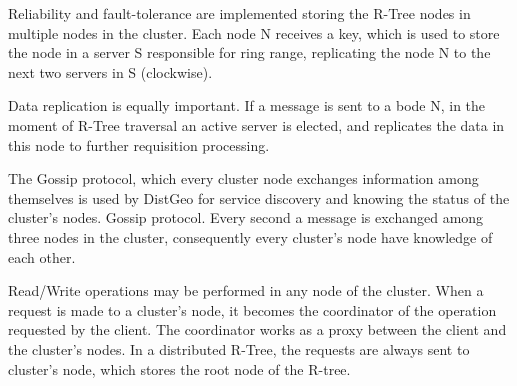 	Reliability and fault-tolerance are implemented storing the R-Tree nodes in multiple nodes in the cluster. Each node N receives a key, which is used to store the node in a server S responsible for ring range, replicating the node N to the next two servers in S (clockwise).
	
	Data replication is equally important. If a message is sent to a bode N, in the moment of R-Tree traversal an active server is elected, and replicates the data in this node to further requisition processing.
	
	The Gossip protocol, which every cluster node exchanges information among themselves is used by DistGeo for service discovery and knowing the status of the cluster's nodes. Gossip protocol. Every second a message is exchanged among three nodes in the cluster, consequently every cluster's node have knowledge of each other.
	
	Read/Write operations may be performed in any node of the cluster. When a request is made to a cluster's node, it becomes the coordinator of the operation requested by the client. The coordinator works as a proxy between the client and the cluster's nodes. In a distributed R-Tree, the requests are always sent to cluster's node, which stores the root node of the R-tree.